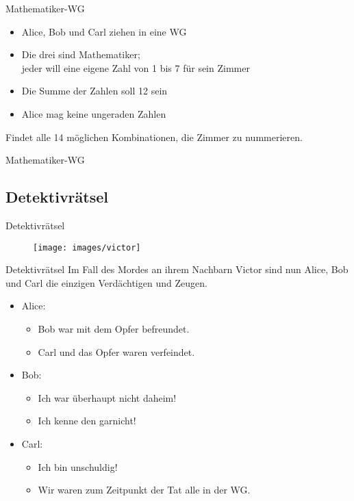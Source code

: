 \documentclass{beamer}
\begin{document}
\begin{frame}{Mathematiker-WG}
	\begin{itemize}
		\item Alice, Bob und Carl ziehen in eine WG
		\item Die drei sind Mathematiker;\\jeder will eine eigene Zahl von 1 bis 7 für sein Zimmer
		\item Die Summe der Zahlen soll 12 sein
		\item Alice mag keine ungeraden Zahlen
	\end{itemize}

	Findet alle 14 möglichen Kombinationen, die Zimmer zu nummerieren.
\end{frame}

\begin{frame}{Mathematiker-WG}
\end{frame}

\subsection{Detektivrätsel}

\begin{frame}{Detektivrätsel}
	\begin{figure}
		\texttt{[image: images/victor]}
	\end{figure}
\end{frame}

\begin{frame}{Detektivrätsel}
	Im Fall des Mordes an ihrem Nachbarn Victor sind nun Alice, Bob und Carl die einzigen Verdächtigen und Zeugen.
	\begin{itemize}
		\item Alice:
		\begin{itemize}
			\item Bob war mit dem Opfer befreundet.
			\item Carl und das Opfer waren verfeindet.
		\end{itemize}
		\item Bob:
		\begin{itemize}
			\item Ich war überhaupt nicht daheim!
			\item Ich kenne den garnicht!
		\end{itemize}
		\item Carl:
		\begin{itemize}
			\item Ich bin unschuldig!
			\item Wir waren zum Zeitpunkt der Tat alle in der WG.
		\end{itemize}
	\end{itemize}
\end{frame}
\end{document}
